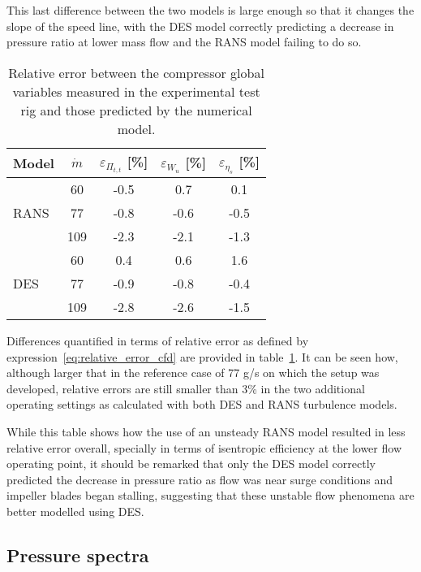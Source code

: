 This last difference between the two models is large enough so that it changes the slope of the speed line, with the DES model correctly predicting a decrease in pressure ratio at lower mass flow and the RANS model failing to do so. 

\begin{table}[htb!]
\centering
\caption{Relative error between the compressor global variables measured in the experimental test rig and those predicted by the numerical model.}
\footnotesize
\begin{tabular}{lcccc}
\toprule
Model & $\dot{m}$ & $\varepsilon_{\varPi_{t,t}}$ [\%] & $\varepsilon_{W_u}$ [\%] & $\varepsilon_{\eta_s}$ [\%] \\ \midrule

\multirow{3}{*}{RANS} & 60 & -0.5 & 0.7 & 0.1  \\ 
					& 77 & -0.8 & -0.6 & -0.5  \\
					& 109 & -2.3 & -2.1 & -1.3  \\ \midrule
					
\multirow{3}{*}{DES} & 60 & 0.4 & 0.6 & 1.6  \\
					& 77 & -0.9 & -0.8 & -0.4  \\
					& 109 & -2.8 & -2.6 & -1.5  \\ \bottomrule
\end{tabular}
\label{tab:ops_globalVariables}
\end{table}

Differences quantified in terms of relative error as defined by expression~\ref{eq:relative_error_cfd} are provided in table~\ref{tab:ops_globalVariables}. It can be seen how, although larger that in the reference case of 77 g/s on which the setup was developed, relative errors are still smaller than 3\% in the two additional operating settings as calculated with both DES and RANS turbulence models.

While this table shows how the use of an unsteady RANS model resulted in less relative error overall, specially in terms of isentropic efficiency at the lower flow operating point, it should be remarked that only the DES model correctly predicted the decrease in pressure ratio as flow was near surge conditions and impeller blades began stalling, suggesting that these unstable flow phenomena are better modelled using DES. 

\subsection{Pressure spectra}

